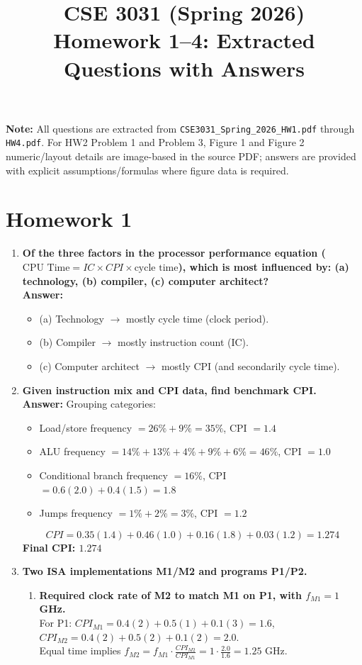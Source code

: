 \documentclass[11pt]{article}
\title{CSE 3031 (Spring 2026)\\Homework 1--4: Extracted Questions with Answers}
\date{}
\begin{document}
\maketitle

\textbf{Note:} All questions are extracted from \texttt{CSE3031\_Spring\_2026\_HW1.pdf} through \texttt{HW4.pdf}. For HW2 Problem 1 and Problem 3, Figure 1 and Figure 2 numeric/layout details are image-based in the source PDF; answers are provided with explicit assumptions/formulas where figure data is required.

\section*{Homework 1}
\begin{enumerate}
\item \textbf{Of the three factors in the processor performance equation ($\text{CPU Time}=IC\times CPI\times\text{cycle time}$), which is most influenced by: (a) technology, (b) compiler, (c) computer architect?}\\
\textbf{Answer:}
\begin{itemize}
\item (a) Technology $\rightarrow$ mostly cycle time (clock period).
\item (b) Compiler $\rightarrow$ mostly instruction count (IC).
\item (c) Computer architect $\rightarrow$ mostly CPI (and secondarily cycle time).
\end{itemize}

\item \textbf{Given instruction mix and CPI data, find benchmark CPI.}\\
\textbf{Answer:} Grouping categories:
\begin{itemize}
\item Load/store frequency $=26\%+9\%=35\%$, CPI $=1.4$
\item ALU frequency $=14\%+13\%+4\%+9\%+6\%=46\%$, CPI $=1.0$
\item Conditional branch frequency $=16\%$, CPI $=0.6(2.0)+0.4(1.5)=1.8$
\item Jumps frequency $=1\%+2\%=3\%$, CPI $=1.2$
\end{itemize}
\[
CPI = 0.35(1.4)+0.46(1.0)+0.16(1.8)+0.03(1.2)=1.274
\]
\textbf{Final CPI: $\boxed{1.274}$}

\item \textbf{Two ISA implementations M1/M2 and programs P1/P2.}
\begin{enumerate}[label=(\alph*)]
\item \textbf{Required clock rate of M2 to match M1 on P1, with $f_{M1}=1$ GHz.}\\
For P1: $CPI_{M1}=0.4(2)+0.5(1)+0.1(3)=1.6$, $CPI_{M2}=0.4(2)+0.5(2)+0.1(2)=2.0$.\\
Equal time implies $f_{M2}=f_{M1}\cdot \frac{CPI_{M2}}{CPI_{M1}}=1\cdot\frac{2.0}{1.6}=\boxed{1.25\text{ GHz}}$.


\end{enumerate}
\end{enumerate}
\end{document}
